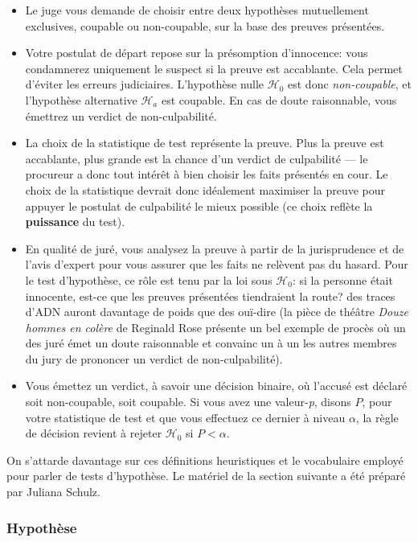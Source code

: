 \documentclass[
  11pt,
  letterpaper,
]{article}
\providecommand{\tightlist}{%
  \setlength{\itemsep}{0pt}\setlength{\parskip}{0pt}}
\theoremstyle{definition}
\theoremstyle{definition}
\theoremstyle{definition}
\theoremstyle{definition}
\theoremstyle{remark}
\begin{document}
\begin{itemize}
\tightlist
\item
  Le juge vous demande de choisir entre deux hypothèses mutuellement exclusives, coupable ou non-coupable, sur la base des preuves présentées.
\item
  Votre postulat de départ repose sur la présomption d'innocence: vous condamnerez uniquement le suspect si la preuve est accablante. Cela permet d'éviter les erreurs judiciaires. L'hypothèse nulle \(\mathscr{H}_0\) est donc \emph{non-coupable}, et l'hypothèse alternative \(\mathscr{H}_a\) est coupable. En cas de doute raisonnable, vous émettrez un verdict de non-culpabilité.
\item
  La choix de la statistique de test représente la preuve. Plus la preuve est accablante, plus grande est la chance d'un verdict de culpabilité --- le procureur a donc tout intérêt à bien choisir les faits présentés en cour. Le choix de la statistique devrait donc idéalement maximiser la preuve pour appuyer le postulat de culpabilité le mieux possible (ce choix reflète la \textbf{puissance} du test).
\item
  En qualité de juré, vous analysez la preuve à partir de la jurisprudence et de l'avis d'expert pour vous assurer que les faits ne relèvent pas du hasard. Pour le test d'hypothèse, ce rôle est tenu par la loi sous \(\mathscr{H}_0\): si la personne était innocente, est-ce que les preuves présentées tiendraient la route? des traces d'ADN auront davantage de poids que des ouï-dire (la pièce de théâtre \emph{Douze hommes en colère} de Reginald Rose présente un bel exemple de procès où un des juré émet un doute raisonnable et convainc un à un les autres membres du jury de prononcer un verdict de non-culpabilité).
\item
  Vous émettez un verdict, à savoir une décision binaire, où l'accusé est déclaré soit non-coupable, soit coupable. Si vous avez une valeur-\emph{p}, disons \(P\), pour votre statistique de test et que vous effectuez ce dernier à niveau \(\alpha\), la règle de décision revient à rejeter \(\mathscr{H}_0\) si \(P < \alpha\).
\end{itemize}

On s'attarde davantage sur ces définitions heuristiques et le vocabulaire employé pour parler de tests d'hypothèse. Le matériel de la section suivante a été préparé par Juliana Schulz.

\hypertarget{hypothuxe8se}{%
\subsubsection{Hypothèse}\label{hypothuxe8se}}
\end{document}
